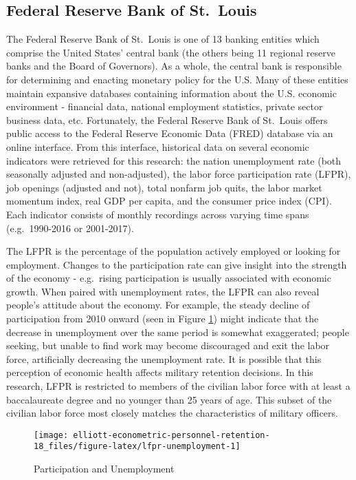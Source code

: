\documentclass[12pt,letterpaper,toc=flat,oneside]{report}
\theoremstyle{definition}
\theoremstyle{definition}
\theoremstyle{definition}
\theoremstyle{remark}
\begin{document}
\hypertarget{federal-reserve-bank-of-st.louis}{%
\subsection{Federal Reserve Bank of
St.~Louis}\label{federal-reserve-bank-of-st.louis}}

The Federal Reserve Bank of St.~Louis is one of 13 banking entities
which comprise the United States' central bank (the others being 11
regional reserve banks and the Board of Governors). As a whole, the
central bank is responsible for determining and enacting monetary policy
for the U.S. Many of these entities maintain expansive databases
containing information about the U.S. economic environment - financial
data, national employment statistics, private sector business data, etc.
Fortunately, the Federal Reserve Bank of St.~Louis offers public access
to the Federal Reserve Economic Data (FRED) database via an online
interface. From this interface, historical data on several economic
indicators were retrieved for this research: the nation unemployment
rate (both seasonally adjusted and non-adjusted), the labor force
participation rate (LFPR), job openings (adjusted and not), total
nonfarm job quits, the labor market momentum index, real GDP per capita,
and the consumer price index (CPI). Each indicator consists of monthly
recordings across varying time spans (e.g.~1990-2016 or 2001-2017).

The LFPR is the percentage of the population actively employed or
looking for employment. Changes to the participation rate can give
insight into the strength of the economy - e.g.~rising participation is
usually associated with economic growth. When paired with unemployment
rates, the LFPR can also reveal people's attitude about the economy. For
example, the steady decline of participation from 2010 onward (seen in
Figure \ref{fig:lfpr-unemployment}) might indicate that the decrease in
unemployment over the same period is somewhat exaggerated; people
seeking, but unable to find work may become discouraged and exit the
labor force, artificially decreasing the unemployment rate. It is
possible that this perception of economic health affects military
retention decisions. In this research, LFPR is restricted to members of
the civilian labor force with at least a baccalaureate degree and no
younger than 25 years of age. This subset of the civilian labor force
most closely matches the characteristics of military officers.

\begin{figure}[H]

{\centering \texttt{[image: elliott-econometric-personnel-retention-18\_files/figure-latex/lfpr-unemployment-1]} 

}

\caption{Participation and Unemployment}\label{fig:lfpr-unemployment}
\end{figure}
\end{document}
